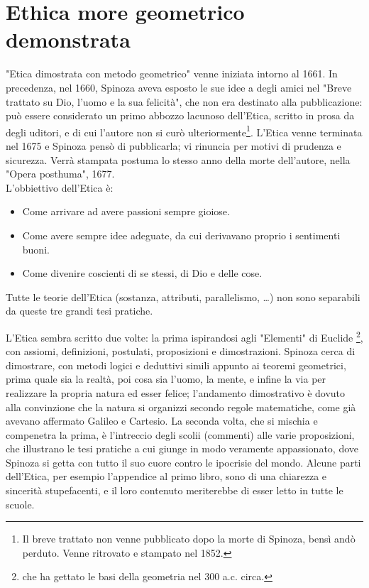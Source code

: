 \chapter[Etica]{Ethica more geometrico demonstrata}
\bigskip
"Etica dimostrata con metodo geometrico" venne iniziata intorno al 1661. In precedenza, nel 1660, Spinoza aveva esposto le sue idee a degli amici nel "Breve trattato su Dio, l'uomo e la sua felicità", che non era destinato alla pubblicazione: può essere considerato un primo abbozzo lacunoso dell'Etica, scritto in prosa da degli uditori, e di cui l'autore non si curò ulteriormente\footnote{Il breve trattato non venne pubblicato dopo la morte di Spinoza, bensì andò perduto. Venne ritrovato e stampato nel 1852.}. L'Etica venne terminata nel 1675 e Spinoza pensò di pubblicarla; vi rinuncia per motivi di prudenza e sicurezza. Verrà stampata postuma lo stesso anno della morte dell'autore, nella "Opera posthuma", 1677.
\\L'obbiettivo dell'Etica è:\begin{itemize}
	\item Come arrivare ad avere passioni sempre gioiose.
	\item Come avere sempre idee adeguate, da cui derivavano proprio i sentimenti buoni.
	\item Come divenire coscienti di se stessi, di Dio e delle cose.
\end{itemize}

Tutte le teorie dell'Etica (sostanza, attributi, parallelismo, \dots) non sono separabili da queste tre grandi tesi pratiche.

L'Etica sembra scritto due volte: la prima ispirandosi agli "Elementi" di Euclide \footnote{che ha gettato le basi della geometria nel 300 a.c. circa.}, con assiomi, definizioni, postulati, proposizioni e dimostrazioni. Spinoza cerca di dimostrare, con metodi logici e deduttivi simili appunto ai teoremi geometrici, prima quale sia la realtà, poi cosa sia l'uomo, la mente, e infine la via per realizzare la propria natura ed esser felice; l'andamento dimostrativo è dovuto alla convinzione che la natura si organizzi secondo regole matematiche, come già avevano affermato Galileo e Cartesio. La seconda volta, che si mischia e compenetra la prima, è l'intreccio degli scolii (commenti) alle varie proposizioni, che illustrano le tesi pratiche a cui giunge in modo veramente appassionato, dove Spinoza si getta con tutto il suo cuore contro le ipocrisie del mondo. Alcune parti dell'Etica, per esempio l'appendice al primo libro, sono di una chiarezza e sincerità stupefacenti, e il loro contenuto meriterebbe di esser letto in tutte le scuole.
\newpage

